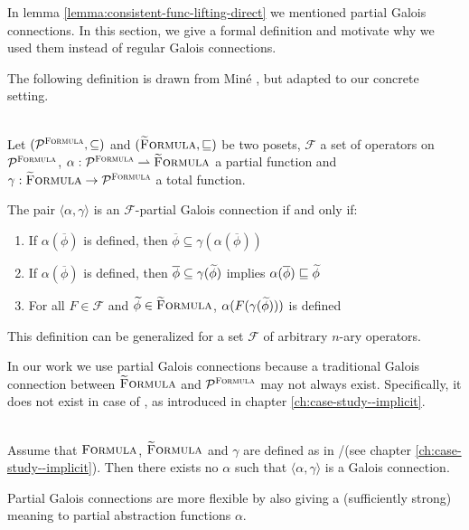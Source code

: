In lemma \ref{lemma:consistent-func-lifting-direct} we mentioned partial Galois connections.
In this section, we give a formal definition and motivate why we used them instead of regular Galois connections.

The following definition is drawn from Miné \cite{mine2004weakly}, but adapted to our concrete setting.
\begin{definition}\label{def:pgc} ~\\
    Let $(\mathcal{P}^{\textup{\textsc{Formula}}}, \subseteq)$ and $(\textup{\textsc{\ensuremath{\widetilde{\text{F}}}ormula}}, \sqsubseteq)$ be two posets, $\mathcal{F}$ a set of operators on $\mathcal{P}^{\textup{\textsc{Formula}}}$, $\alpha : \mathcal{P}^{\textup{\textsc{Formula}}} \rightharpoonup \textup{\textsc{\ensuremath{\widetilde{\text{F}}}ormula}}$ a partial function and $\gamma : \textup{\textsc{\ensuremath{\widetilde{\text{F}}}ormula}} \rightarrow \mathcal{P}^{\textup{\textsc{Formula}}}$ a total function. 
    
    The pair $\langle \alpha, \gamma \rangle$ is an $\mathcal{F}$-partial Galois connection if and only if:
    \begin{enumerate}
        \item If $\alpha(\overline{\phi})$ is defined, then $\overline{\phi} \subseteq \gamma(\alpha(\overline{\phi}))$
        \item If $\alpha(\overline{\phi})$ is defined, then $\overline{\phi} \subseteq \gamma(\widetilde{\phi})$ implies $\alpha(\overline{\phi}) \sqsubseteq \widetilde{\phi}$
        \item For all $F \in \mathcal{F}$ and $\widetilde{\phi} \in \textup{\textsc{\ensuremath{\widetilde{\text{F}}}ormula}}$, $\alpha(F(\gamma(\widetilde{\phi})))$ is defined
    \end{enumerate}
This definition can be generalized for a set $\mathcal{F}$ of arbitrary $n$-ary operators.
\end{definition}

In our work we use partial Galois connections because a traditional Galois connection between $\textup{\textsc{\ensuremath{\widetilde{\text{F}}}ormula}}$ and $\mathcal{P}^{\textup{\textsc{Formula}}}$ may not always exist.
Specifically, it does not exist in case of \gvlidf, as introduced in chapter \ref{ch:case-study--implicit}.
\begin{lemma}
    \label{lemma:gc-nonex}~\\
    Assume that $\textup{\textsc{Formula}}$, $\textup{\textsc{\ensuremath{\widetilde{\text{F}}}ormula}}$ and $\gamma$ are defined as in \svlidf/\gvlidf (see chapter \ref{ch:case-study--implicit}).
    Then there exists no $\alpha$ such that $\langle \alpha, \gamma \rangle$ is a Galois connection.
\end{lemma}

Partial Galois connections are more flexible by also giving a (sufficiently strong) meaning to partial abstraction functions $\alpha$.




